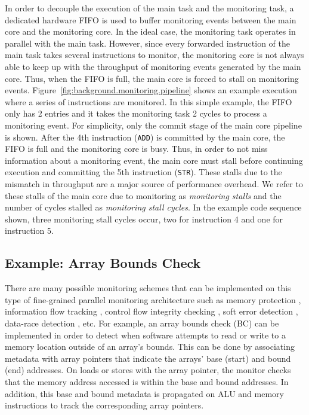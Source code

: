 In order to decouple the execution of the main task and the monitoring task, a
dedicated hardware FIFO is used to buffer monitoring events between the main
core and the monitoring core.  In the ideal case, the monitoring task operates
in parallel with the main task.  However, since 
every forwarded instruction of the main task
takes several instructions to monitor, the monitoring core is not always able to keep
up with the throughput of monitoring events generated by the main core.  Thus,
when the FIFO is full, the main core is forced to stall on monitoring events.
Figure~\ref{fig:background.monitoring.pipeline} shows an example
execution where a series of instructions are monitored. In this simple example,
the FIFO only has 2 entries and it takes the monitoring task 2 cycles to
process a monitoring event. For simplicity, only the commit stage of the main
core pipeline is shown.  After the 4th instruction ({\tt ADD}) is committed by
the main core, the FIFO is full and the monitoring core is busy. Thus, in order
to not miss information about a monitoring event, the main core must stall
before continuing execution and committing the 5th instruction ({\tt STR}).
These stalls due to the mismatch in throughput are a major source of performance overhead.
We refer to these stalls of the main core due to monitoring as \emph{monitoring
stalls} and the number of cycles stalled as \emph{monitoring stall cycles}. In
the example code sequence shown, three monitoring stall cycles occur, two for
instruction 4 and one for instruction 5.

\subsection{Example: Array Bounds Check}
\label{sec:background.monitoring.example}

There are many possible monitoring schemes that can be implemented on this type
of fine-grained parallel monitoring architecture such as memory protection
\cite{mondrian-asplos02}, information flow tracking \cite{dift-asplos04,
testudo-micro08}, control flow integrity checking \cite{hafix-dac15}, soft error
detection \cite{argus-micro07}, data-race
detection \cite{cord-hpca06, eraser-tocs97, literace-pldi09, pacer-pldi10},
etc.  For example, an array bounds check (BC) \cite{hardbound-asplos08} can be
implemented in order to detect when software attempts to read or write to a
memory location outside of an array's bounds. This can be done by associating
metadata with array pointers that indicate the arrays' base (start) and bound
(end) addresses. On loads or stores with the array pointer, the monitor checks
that the memory address accessed is within the base and bound addresses. In
addition, this base and bound metadata is propagated on ALU and memory
instructions to track the corresponding array pointers.

